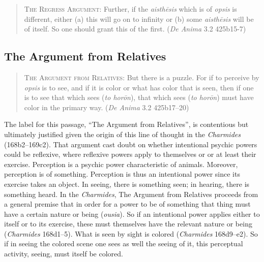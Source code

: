 \begin{quote}
	\textsc{The Regress Argument}: Further, if the \emph{aisthēsis} which is of \emph{opsis} is different, either (a) this will go on to infinity or (b) some \emph{aisthēsis} will be of itself. So one should grant this of the first. (\emph{De Anima} 3.2 425b15-7)
\end{quote}




\subsection{The Argument from Relatives} %
\label{sub:the_argument_from_relatives}

\begin{quote}
	\textsc{The Argument from Relatives}: But there is a puzzle. For if to perceive by \emph{opsis} is to see, and if it is color or what has color that is seen, then if one is to see that which sees (\emph{to horōn}), that which sees (\emph{to horōn}) must have color in the primary way. (\emph{De Anima} 3.2 425b17–20)
\end{quote}

The label for this passage, ``The Argument from Relatives'', is contentious but ultimately justified given the origin of this line of thought in the \emph{Charmides} (168b2–169c2). That argument cast doubt on whether intentional psychic powers could be reflexive, where reflexive powers apply to themselves or or at least their exercise. Perception is a psychic power characteristic of animals. Moreover, perception is of something. Perception is thus an intentional power since its exercise takes an object. In seeing, there is something seen; in hearing, there is something heard. In the \emph{Charmides}, The Argument from Relatives proceeds from a general premise that in order for a power to be of something that thing must have a certain nature or being (\emph{ousia}). So if an intentional power applies either to itself or to its exercise, these must themselves have the relevant nature or being (\emph{Charmides} 168d1–5). What is seen by sight is colored (\emph{Charmides} 168d9–e2). So if in seeing the colored scene one sees as well the seeing of it, this perceptual activity, seeing, must itself be colored.

